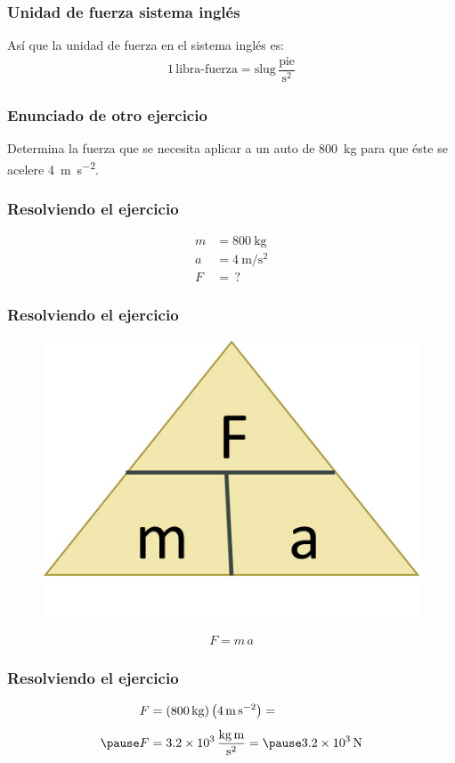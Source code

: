 \documentclass[14pt]{beamer}
\begin{document}
\begin{frame}
\frametitle{Unidad de fuerza sistema inglés}
Así que la unidad de fuerza en el sistema inglés es:
\pause
\begin{align*}
1 \, \text{libra-fuerza} = \text{slug} \, \dfrac{\text{pie}}{\unit{\square\second}}
\end{align*}
\end{frame}
\begin{frame}
\frametitle{Enunciado de otro ejercicio}
Determina la fuerza que se necesita aplicar a un auto de \SI{800}{\kilo\gram} para que éste se acelere \SI{4}{\meter\per\square\second}.
\end{frame}
\begin{frame}
\frametitle{Resolviendo el ejercicio}
\pause
\begin{align*}
m &= \SI{800}{\kilo\gram} \\[0.5em]
a &= \SI{4}{\meter\per\square\second} \\[0.5em]
F &= \, ?
\end{align*}
\end{frame}
\begin{frame}
\frametitle{Resolviendo el ejercicio}
\pause
\begin{figure}
    \centering
    \includegraphics[scale=1]{Imagenes/Newton_11.jpg}
\end{figure}
\pause
\begin{align*}
F = m \, a
\end{align*}
\end{frame}
\begin{frame}
\frametitle{Resolviendo el ejercicio}
\pause
\begin{eqnarray*}
\begin{aligned}
F &= \left( \SI{800}{\kilo\gram} \right) \left( \SI{4}{\meter\per\square\second} \right) = \\[0.5em] \pause
F &= \SI[per-mode=fraction]{3.2d3}{\kilo\gram\meter\per\square\second} = \pause \SI{3.2d3}{\newton}
\end{aligned}
\end{eqnarray*}
\end{frame}    
\end{document}
